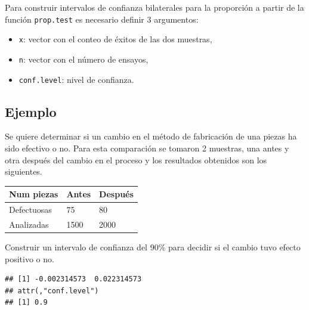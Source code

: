 \documentclass[
]{book}
\makeatletter
\newenvironment{Shaded}{\begin{snugshade}}{\end{snugshade}}
\newcommand{\AttributeTok}[1]{\textcolor[rgb]{0.77,0.63,0.00}{#1}}
\newcommand{\DecValTok}[1]{\textcolor[rgb]{0.00,0.00,0.81}{#1}}
\newcommand{\FloatTok}[1]{\textcolor[rgb]{0.00,0.00,0.81}{#1}}
\newcommand{\FunctionTok}[1]{\textcolor[rgb]{0.00,0.00,0.00}{#1}}
\newcommand{\NormalTok}[1]{#1}
\newcommand{\SpecialCharTok}[1]{\textcolor[rgb]{0.00,0.00,0.00}{#1}}
\providecommand{\tightlist}{%
  \setlength{\itemsep}{0pt}\setlength{\parskip}{0pt}}
\newenvironment{kframe}{%
\medskip{}
\setlength{\fboxsep}{.8em}
 \def\at@end@of@kframe{}%
 \ifinner\ifhmode%
  \def\at@end@of@kframe{\end{minipage}}%
  \begin{minipage}{\columnwidth}%
 \fi\fi%
 \def\FrameCommand##1{\hskip\@totalleftmargin \hskip-\fboxsep
 \colorbox{shadecolor}{##1}\hskip-\fboxsep
     \hskip-\linewidth \hskip-\@totalleftmargin \hskip\columnwidth}%
 \MakeFramed {\advance\hsize-\width
   \@totalleftmargin\z@ \linewidth\hsize
   \@setminipage}}%
 {\par\unskip\endMakeFramed%
 \at@end@of@kframe}
\renewenvironment{Shaded}{\begin{kframe}}{\end{kframe}}
\makeatother
\begin{document}
Para construir intervalos de confianza bilaterales para la proporción a partir de la función \texttt{prop.test} es necesario definir 3 argumentos:

\begin{itemize}
\tightlist
\item
  \texttt{x}: vector con el conteo de éxitos de las dos muestras,
\item
  \texttt{n}: vector con el número de ensayos,
\item
  \texttt{conf.level}: nivel de confianza.
\end{itemize}

\hypertarget{ejemplo-62}{%
\subsection*{Ejemplo}\label{ejemplo-62}}

Se quiere determinar si un cambio en el método de fabricación de una piezas ha sido efectivo o no. Para esta comparación se tomaron 2 muestras, una antes y otra después del cambio en el proceso y los resultados obtenidos son los siguientes.

\begin{longtable}[]{@{}lll@{}}
\toprule
Num piezas & Antes & Después \\
\midrule
\endhead
Defectuosas & 75 & 80 \\
Analizadas & 1500 & 2000 \\
\bottomrule
\end{longtable}

Construir un intervalo de confianza del 90\% para decidir si el cambio tuvo efecto positivo o no.

\begin{Shaded}
\end{Shaded}

\begin{verbatim}
## [1] -0.002314573  0.022314573
## attr(,"conf.level")
## [1] 0.9
\end{verbatim}
\end{document}
